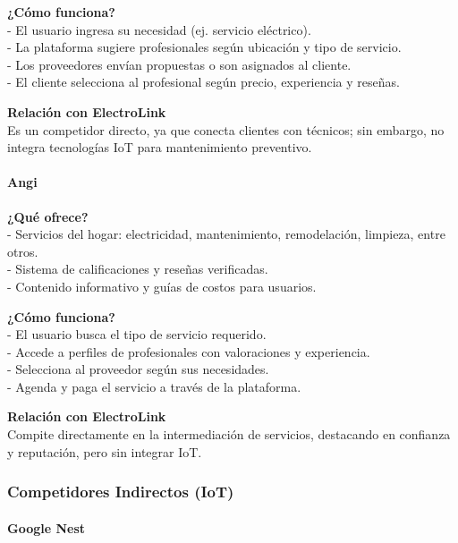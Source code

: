 \textbf{¿Cómo funciona?}\\
- El usuario ingresa su necesidad (ej. servicio eléctrico).\\
- La plataforma sugiere profesionales según ubicación y tipo de
servicio.\\
- Los proveedores envían propuestas o son asignados al cliente.\\
- El cliente selecciona al profesional según precio, experiencia y
reseñas.

\textbf{Relación con ElectroLink}\\
Es un competidor directo, ya que conecta clientes con técnicos; sin
embargo, no integra tecnologías IoT para mantenimiento preventivo.

\paragraph{Angi}\label{report__20-cap2-requirements-analysis.md__angi}

\textbf{¿Qué ofrece?}\\
- Servicios del hogar: electricidad, mantenimiento, remodelación,
limpieza, entre otros.\\
- Sistema de calificaciones y reseñas verificadas.\\
- Contenido informativo y guías de costos para usuarios.

\textbf{¿Cómo funciona?}\\
- El usuario busca el tipo de servicio requerido.\\
- Accede a perfiles de profesionales con valoraciones y experiencia.\\
- Selecciona al proveedor según sus necesidades.\\
- Agenda y paga el servicio a través de la plataforma.

\textbf{Relación con ElectroLink}\\
Compite directamente en la intermediación de servicios, destacando en
confianza y reputación, pero sin integrar IoT.

\subsubsection{Competidores Indirectos
(IoT)}\label{report__20-cap2-requirements-analysis.md__competidores-indirectos-iot}

\paragraph{Google
Nest}\label{report__20-cap2-requirements-analysis.md__google-nest}

